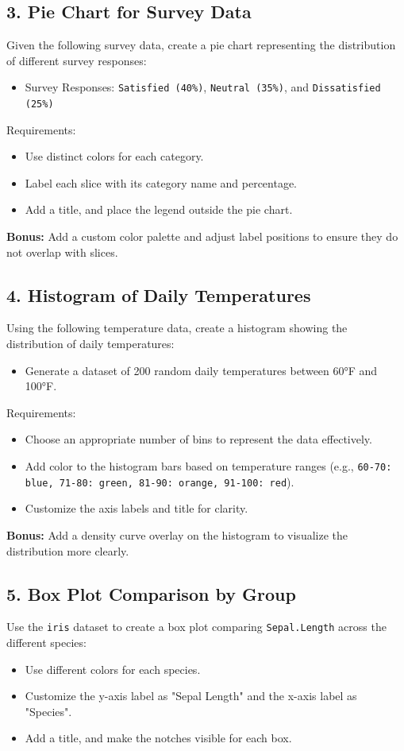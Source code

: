 \documentclass[10pt]{book}
\begin{document}
\subsection*{3. Pie Chart for Survey Data}
Given the following survey data, create a pie chart representing the distribution of different survey responses:
\begin{itemize}
    \item Survey Responses: \texttt{Satisfied (40\%)}, \texttt{Neutral (35\%)}, and \texttt{Dissatisfied (25\%)}
\end{itemize}
Requirements:
\begin{itemize}
    \item Use distinct colors for each category.
    \item Label each slice with its category name and percentage.
    \item Add a title, and place the legend outside the pie chart.
\end{itemize}

\textbf{Bonus:} Add a custom color palette and adjust label positions to ensure they do not overlap with slices.

\subsection*{4. Histogram of Daily Temperatures}
Using the following temperature data, create a histogram showing the distribution of daily temperatures:
\begin{itemize}
    \item Generate a dataset of 200 random daily temperatures between 60°F and 100°F.
\end{itemize}
Requirements:
\begin{itemize}
    \item Choose an appropriate number of bins to represent the data effectively.
    \item Add color to the histogram bars based on temperature ranges (e.g., \texttt{60-70: blue, 71-80: green, 81-90: orange, 91-100: red}).
    \item Customize the axis labels and title for clarity.
\end{itemize}

\textbf{Bonus:} Add a density curve overlay on the histogram to visualize the distribution more clearly.

\subsection*{5. Box Plot Comparison by Group}
Use the \texttt{iris} dataset to create a box plot comparing \texttt{Sepal.Length} across the different species:
\begin{itemize}
    \item Use different colors for each species.
    \item Customize the y-axis label as "Sepal Length" and the x-axis label as "Species".
    \item Add a title, and make the notches visible for each box.
\end{itemize}
\end{document}

